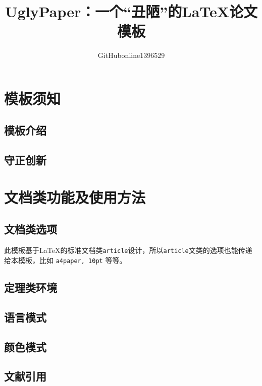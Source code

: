 \documentclass[10pt, twocolumn, compact, crimson]{uglypaper}
\title{\bfseries UglyPaper：一个“丑陋”的\LaTeX{}论文模板}
\author{GitHubonline1396529}
\date{\zhdate{2022/12/31}}
\begin{document}

\section{模板须知}
\subsection{模板介绍}


\subsection{守正创新}


\section{文档类功能及使用方法}
\subsection{文档类选项}\label{ssec:classoptions}

此模板基于\LaTeX{}的标准文档类\texttt{article}设计，所以\texttt{article}文类的选项也能传递给本模板，比如 \texttt{a4paper, 10pt} 等等。



\subsection{定理类环境}


\subsection{语言模式}


\subsection{颜色模式}\label{ssec:colors}


\subsection{文献引用}

\end{document}
